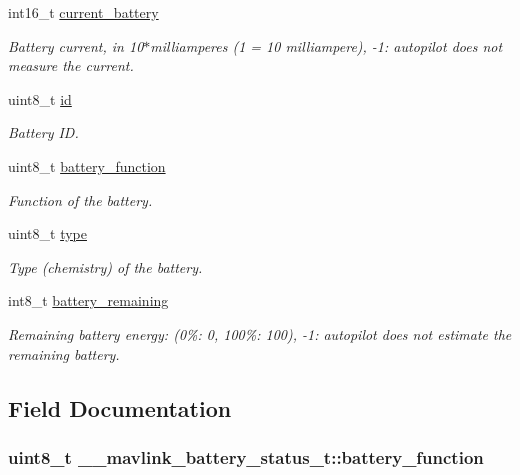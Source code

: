 \begin{DoxyCompactItemize}
int16\+\_\+t \hyperlink{struct____mavlink__battery__status__t_a1577349498c9881468031a20cd2faeae}{current\+\_\+battery}
\begin{DoxyCompactList}\small\item\em Battery current, in 10$\ast$milliamperes (1 = 10 milliampere), -\/1\+: autopilot does not measure the current. \end{DoxyCompactList}\item 
uint8\+\_\+t \hyperlink{struct____mavlink__battery__status__t_a206a47f6c36d68742a1fa6c1e9fcc475}{id}
\begin{DoxyCompactList}\small\item\em Battery I\+D. \end{DoxyCompactList}\item 
uint8\+\_\+t \hyperlink{struct____mavlink__battery__status__t_aa0663b0e2bad4c0ad55f84929fb43b44}{battery\+\_\+function}
\begin{DoxyCompactList}\small\item\em Function of the battery. \end{DoxyCompactList}\item 
uint8\+\_\+t \hyperlink{struct____mavlink__battery__status__t_a9dbaa36faa0b0305c78c0336494a2415}{type}
\begin{DoxyCompactList}\small\item\em Type (chemistry) of the battery. \end{DoxyCompactList}\item 
int8\+\_\+t \hyperlink{struct____mavlink__battery__status__t_aa2aa73e1a73123460a4da3e3918ca434}{battery\+\_\+remaining}
\begin{DoxyCompactList}\small\item\em Remaining battery energy\+: (0\%\+: 0, 100\%\+: 100), -\/1\+: autopilot does not estimate the remaining battery. \end{DoxyCompactList}\end{DoxyCompactItemize}


\subsection{Field Documentation}
\hypertarget{struct____mavlink__battery__status__t_aa0663b0e2bad4c0ad55f84929fb43b44}{
\subsubsection[{battery\+\_\+function}]{\setlength{\rightskip}{0pt plus 5cm}uint8\+\_\+t \+\_\+\+\_\+mavlink\+\_\+battery\+\_\+status\+\_\+t\+::battery\+\_\+function}}\label{struct____mavlink__battery__status__t_aa0663b0e2bad4c0ad55f84929fb43b44}


